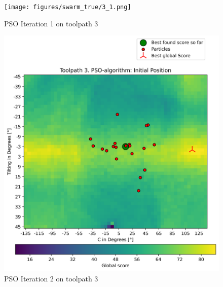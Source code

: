 \begin{figure}[H]
	\centering
	\begin{minipage}{0.5\textwidth}
		\texttt{[image: figures/swarm\_true/3\_1.png]}
		\caption{PSO Iteration 1 on toolpath 3}
		\label{1_true}
	\end{minipage}\hfill
	\begin{minipage}{0.5\textwidth}
		\includegraphics[width=\textwidth]{figures/swarm_true/3_2.png}
		\caption{PSO Iteration 2 on toolpath 3}
		\label{2_true}
	\end{minipage}\par
\end{figure}	

